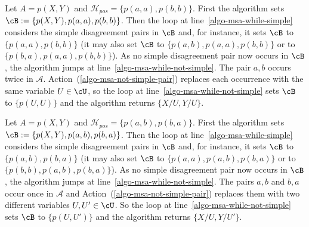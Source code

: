 \documentclass[fleqn]{tlp}
\newcommand{\Hpos}{\mathcal{H}_{\mathit{pos}}}
\begin{document}
\begin{appendix}
\begin{example}
  Let $A = p(X,Y)$ and $\Hpos = \{p(a,a),p(b,b)\}$.
  First the algorithm sets $\cB:=\{p(X,Y),p(a,a),p(b,b)\}$.
  Then the loop at line~\ref{algo-msa-while-simple}
  considers the simple disagreement pairs in $\cB$ and,
  for instance, it sets $\cB$ to $\{p(a,a),p(b,b)\}$
  (it may also set $\cB$ to $\{p(a,b),p(a,a),p(b,b)\}$
  or to $\{p(b,a),p(a,a),p(b,b)\}$).
  As no simple disagreement pair now occurs in $\cB$, the
  algorithm jumps at line~\ref{algo-msa-while-not-simple}.
  The pair $a,b$ occurs twice in $\mathcal{A}$.
  Action~(\ref{algo-msa-not-simple-pair}) replaces each occurrence
  with the same variable $U \in \cU$, so the loop at
  line~\ref{algo-msa-while-not-simple} sets
  $\cB$ to $\{p(U,U)\}$ and the algorithm returns $\{X/U,Y/U\}$.
\end{example}

\begin{example}
  Let $A = p(X,Y)$ and $\Hpos = \{p(a,b),p(b,a)\}$.
  First the algorithm sets $\cB:=\{p(X,Y),p(a,b),p(b,a)\}$.
  Then the loop at line~\ref{algo-msa-while-simple}
  considers the simple disagreement pairs in $\cB$ and,
  for instance, it sets $\cB$ to $\{p(a,b),p(b,a)\}$
  (it may also set $\cB$ to $\{p(a,a),p(a,b),p(b,a)\}$
  or to $\{p(b,b),p(a,b),p(b,a)\}$).
  As no simple disagreement pair now occurs in $\cB$, the
  algorithm jumps at line~\ref{algo-msa-while-not-simple}.
  The pairs $a,b$ and $b,a$ occur once in $\mathcal{A}$ and
  Action~(\ref{algo-msa-not-simple-pair}) replaces them with
  two different variables $U,U' \in \cU$.
  So the loop at line~\ref{algo-msa-while-not-simple} sets
  $\cB$ to $\{p(U,U')\}$ and the algorithm returns $\{X/U,Y/U'\}$.
\end{example}

\end{appendix}
\end{document}
